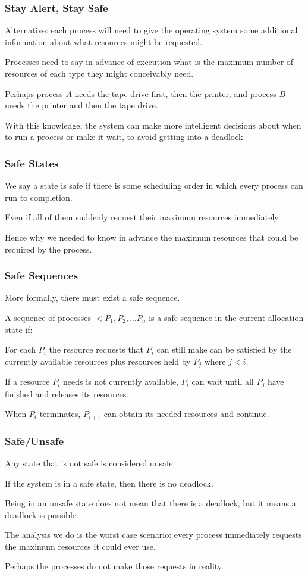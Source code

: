 \begin{frame}
\frametitle{Stay Alert, Stay Safe}

Alternative: each process will need to give the operating system some additional information about what resources might be requested. 

Processes need to say in advance of execution what is the maximum number of resources of each type they might conceivably need. 

Perhaps process $A$ needs the tape drive first, then the printer, and process $B$ needs the printer and then the tape drive. 

With this knowledge, the system can make more intelligent decisions about when to run a process or make it wait, to avoid getting into a deadlock.

\end{frame}



\begin{frame}
\frametitle{Safe States}


We say a state is \alert{safe} if there is some scheduling order in which every process can run to completion.

Even if all of them suddenly request their maximum resources immediately. 

Hence why we needed to know in advance the maximum resources that could be required by the process. 

\end{frame}

\begin{frame}
\frametitle{Safe Sequences}

More formally, there must exist a \alert{safe sequence}.

A sequence of processes $<P_{1}, P_{2}, ... P_{n}$ is a safe sequence in the current allocation state if:

For each $P_{i}$ the resource requests that $P_{i}$ can still make can be satisfied by the currently available resources plus resources held by $P_{j}$ where $j < i$. 

If a resource $P_{i}$ needs is not currently available, $P_{i}$ can wait until all $P_{j}$ have finished and releases its resources. 

When $P_{i}$ terminates, $P_{i+1}$ can obtain its needed resources and continue.

\end{frame}

\begin{frame}
\frametitle{Safe/Unsafe}

Any state that is not safe is considered \alert{unsafe}. 

If the system is in a safe state, then there is no deadlock. 

Being in an unsafe state does not mean that there is a deadlock, but it means a deadlock is possible. 

The analysis we do is the worst case scenario: every process immediately requests the maximum resources it could ever use. 

Perhaps the processes do not make those requests in reality.

\end{frame}

